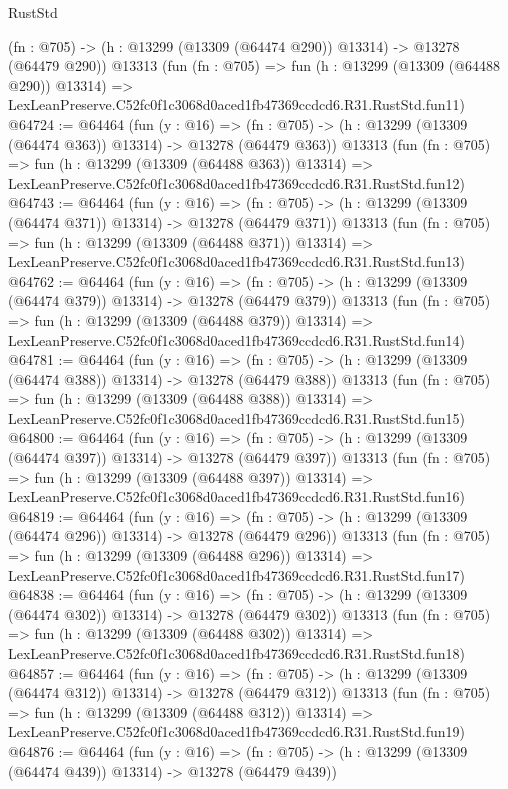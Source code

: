 \begin{lexlean}{RustStd}
\begin{coremodule}
    (fn : @705) -> (h : @13299 (@13309 (@64474 @290)) @13314) -> @13278 (@64479 @290))
    @13313
    (fun (fn : @705) =>
    fun (h : @13299 (@13309 (@64488 @290)) @13314) =>
    LexLeanPreserve.C52fc0f1c3068d0aced1fb47369ccdcd6.R31.RustStd.fun11)
@64724 := @64464
    (fun (y : @16) =>
    (fn : @705) -> (h : @13299 (@13309 (@64474 @363)) @13314) -> @13278 (@64479 @363))
    @13313
    (fun (fn : @705) =>
    fun (h : @13299 (@13309 (@64488 @363)) @13314) =>
    LexLeanPreserve.C52fc0f1c3068d0aced1fb47369ccdcd6.R31.RustStd.fun12)
@64743 := @64464
    (fun (y : @16) =>
    (fn : @705) -> (h : @13299 (@13309 (@64474 @371)) @13314) -> @13278 (@64479 @371))
    @13313
    (fun (fn : @705) =>
    fun (h : @13299 (@13309 (@64488 @371)) @13314) =>
    LexLeanPreserve.C52fc0f1c3068d0aced1fb47369ccdcd6.R31.RustStd.fun13)
@64762 := @64464
    (fun (y : @16) =>
    (fn : @705) -> (h : @13299 (@13309 (@64474 @379)) @13314) -> @13278 (@64479 @379))
    @13313
    (fun (fn : @705) =>
    fun (h : @13299 (@13309 (@64488 @379)) @13314) =>
    LexLeanPreserve.C52fc0f1c3068d0aced1fb47369ccdcd6.R31.RustStd.fun14)
@64781 := @64464
    (fun (y : @16) =>
    (fn : @705) -> (h : @13299 (@13309 (@64474 @388)) @13314) -> @13278 (@64479 @388))
    @13313
    (fun (fn : @705) =>
    fun (h : @13299 (@13309 (@64488 @388)) @13314) =>
    LexLeanPreserve.C52fc0f1c3068d0aced1fb47369ccdcd6.R31.RustStd.fun15)
@64800 := @64464
    (fun (y : @16) =>
    (fn : @705) -> (h : @13299 (@13309 (@64474 @397)) @13314) -> @13278 (@64479 @397))
    @13313
    (fun (fn : @705) =>
    fun (h : @13299 (@13309 (@64488 @397)) @13314) =>
    LexLeanPreserve.C52fc0f1c3068d0aced1fb47369ccdcd6.R31.RustStd.fun16)
@64819 := @64464
    (fun (y : @16) =>
    (fn : @705) -> (h : @13299 (@13309 (@64474 @296)) @13314) -> @13278 (@64479 @296))
    @13313
    (fun (fn : @705) =>
    fun (h : @13299 (@13309 (@64488 @296)) @13314) =>
    LexLeanPreserve.C52fc0f1c3068d0aced1fb47369ccdcd6.R31.RustStd.fun17)
@64838 := @64464
    (fun (y : @16) =>
    (fn : @705) -> (h : @13299 (@13309 (@64474 @302)) @13314) -> @13278 (@64479 @302))
    @13313
    (fun (fn : @705) =>
    fun (h : @13299 (@13309 (@64488 @302)) @13314) =>
    LexLeanPreserve.C52fc0f1c3068d0aced1fb47369ccdcd6.R31.RustStd.fun18)
@64857 := @64464
    (fun (y : @16) =>
    (fn : @705) -> (h : @13299 (@13309 (@64474 @312)) @13314) -> @13278 (@64479 @312))
    @13313
    (fun (fn : @705) =>
    fun (h : @13299 (@13309 (@64488 @312)) @13314) =>
    LexLeanPreserve.C52fc0f1c3068d0aced1fb47369ccdcd6.R31.RustStd.fun19)
@64876 := @64464
    (fun (y : @16) =>
    (fn : @705) -> (h : @13299 (@13309 (@64474 @439)) @13314) -> @13278 (@64479 @439))

\end{coremodule}
\end{lexlean}
